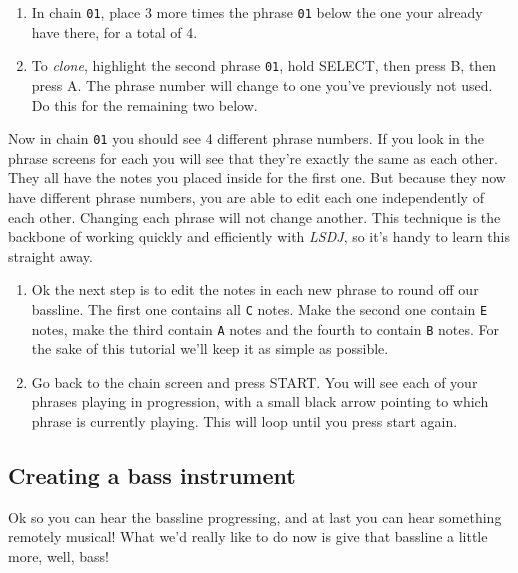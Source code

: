 \documentclass[]{article}
\newcommand{\buttonStyle}[1]{\textsf{#1}\xspace}
\newcommand{\bA}{\buttonStyle{A}}
\newcommand{\bB}{\buttonStyle{B}}
\newcommand{\bStart}{\buttonStyle{{START}}}
\newcommand{\bSelect}{\buttonStyle{{SELECT}}}
\newcommand{\nb}[1]{\texttt{#1}\xspace}
\newcommand{\lsdj}{\textit{LSDJ}\xspace}
\begin{document}
\begin{enumerate}[resume]

\item In chain \nb{01}, place 3 more times the phrase \nb{01} below the one your already have there, for a total of 4.

\item To \textit{clone}, highlight the second phrase \nb{01}, hold \bSelect, then press \bB, then press \bA. The phrase number will change to one you've previously not used. Do this for the remaining two below.

\end{enumerate}

Now in chain \nb{01} you should see 4 different phrase numbers. If you look in the phrase screens for each you will see that they're exactly the same as each other. They all have the notes you placed inside for the first one. But because they now have different phrase numbers, you are able to edit each one independently of each other. Changing each phrase will not change another. This technique is the backbone of working quickly and efficiently with \lsdj, so it's handy to learn this straight away.


\begin{enumerate}[resume]

\item 
Ok the next step is to edit the notes in each new phrase to round off our bassline.
The first one contains all \nb{C} notes. Make the second one contain \nb{E} notes, make the third contain \nb{A} notes and the fourth to contain \nb{B} notes. For the sake of this tutorial we'll keep it as simple as possible.

\item Go back to the chain screen and press \bStart. You will see each of your phrases playing in progression, with a small black arrow pointing to which phrase is currently playing. This will loop until you press start again.

\end{enumerate}


\subsection{Creating a bass instrument}

Ok so you can hear the bassline progressing, and at last you can hear something remotely musical! What we'd really like to do now is give that bassline a little more, well, bass!
\end{document}
